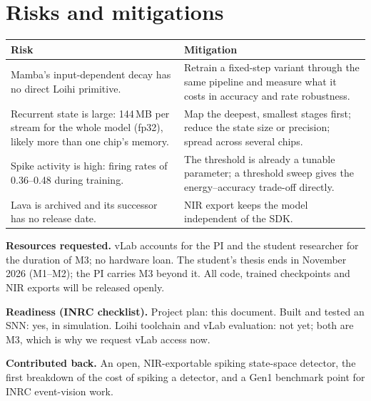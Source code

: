 \documentclass[11pt,a4paper]{article}
\begin{document}
\section{Risks and mitigations}
\begin{center}\small
\begin{tabularx}{\textwidth}{@{}>{\RaggedRight\arraybackslash}p{} Y@{}}
\toprule
\textbf{Risk} & \textbf{Mitigation} \\
\midrule
Mamba's input-dependent decay has no direct Loihi primitive. & Retrain a fixed-step variant through the same
pipeline and measure what it costs in accuracy and rate robustness. \\
Recurrent state is large: 144\,MB per stream for the whole model (fp32), likely more than one chip's memory. &
Map the deepest, smallest stages first; reduce the state size or precision; spread across several chips. \\
Spike activity is high: firing rates of 0.36--0.48 during training. & The threshold is already a tunable
parameter; a threshold sweep gives the energy--accuracy trade-off directly. \\
Lava is archived and its successor has no release date. & NIR export keeps the model independent of the SDK. \\
\bottomrule
\end{tabularx}
\end{center}

\textbf{Resources requested.} vLab accounts for the PI and the student researcher for the duration of M3; no
hardware loan. The student's thesis ends in November 2026 (M1--M2); the PI carries M3 beyond it. All code, trained checkpoints and NIR exports
will be released openly.

\textbf{Readiness (INRC checklist).} Project plan: this document. Built and tested an SNN: yes, in simulation.
Loihi toolchain and vLab evaluation: not yet; both are M3, which is why we request vLab access now.

\textbf{Contributed back.} An open, NIR-exportable spiking state-space detector, the first breakdown of the cost
of spiking a detector, and a Gen1 benchmark point for INRC event-vision work.
\end{document}

